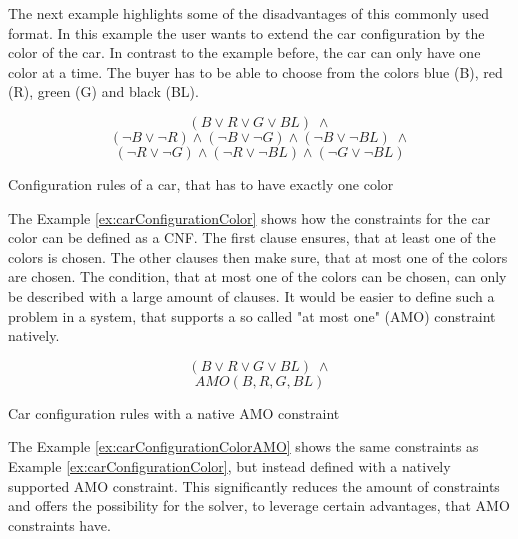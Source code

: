 The next example highlights some of the disadvantages of this commonly used format. In this example the user wants to extend the car configuration by the color of the car. In contrast to the example before, the car can only have one color at a time. The buyer has to be able to choose from the colors blue (B), red (R), green (G) and black (BL).
\begin{example}
\begin{leftbar}
\begin{displaymath}
(B \vee R \vee G \vee BL) \; \wedge
\end{displaymath}
\begin{displaymath}
(\neg B \vee \neg R) \wedge (\neg B \vee \neg G) \wedge (\neg B \vee \neg BL)\; \wedge
\end{displaymath}
\begin{displaymath}
(\neg R \vee \neg G) \wedge (\neg R \vee \neg BL) \wedge (\neg G \vee \neg BL)
\end{displaymath}
\end{leftbar}
\caption{Configuration rules of a car, that has to have exactly one color}
\label{ex:carConfigurationColor}
\end{example}

The Example \ref{ex:carConfigurationColor} shows how the constraints for the car color can be defined as a CNF. The first clause ensures, that at least one of the colors is chosen. The other clauses then make sure, that at most one of the colors are chosen. The condition, that at most one of the colors can be chosen, can only be described with a large amount of clauses. It would be easier to define such a problem in a system, that supports a so called "at most one" (AMO) constraint natively.

\begin{example}
\begin{leftbar}
\begin{displaymath}
(B \vee R \vee G \vee BL) \; \wedge
\end{displaymath}
\begin{displaymath}
AMO(B,R,G,BL)
\end{displaymath}
\end{leftbar}
\caption{Car configuration rules with a native AMO constraint}
\label{ex:carConfigurationColorAMO}
\end{example}

The Example \ref{ex:carConfigurationColorAMO} shows the same constraints as Example \ref{ex:carConfigurationColor}, but instead defined with a natively supported AMO constraint. This significantly reduces the amount of constraints and offers the possibility for the solver, to leverage certain advantages, that AMO constraints have.

